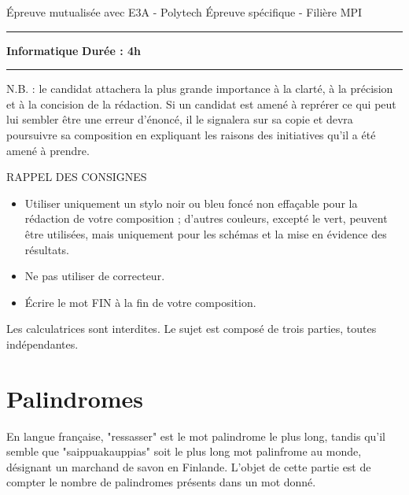 \documentclass[11pt,a4paper,french]{article}
\begin{document}
\begin{center}
  {\large
    Épreuve mutualisée avec E3A - Polytech \linebreak
    Épreuve spécifique - Filière MPI \linebreak
    \hrule
    \vspace{0.5cm}
    \textbf{Informatique} \linebreak
    \textbf{Durée : 4h} \linebreak
    \hrule
  }
\end{center}
N.B. : le candidat attachera la plus grande importance à la clarté, à la précision et à la concision de la rédaction. Si un candidat est amené à reprérer ce qui peut lui sembler être une erreur d'énoncé, il le signalera sur sa copie et devra poursuivre sa composition en expliquant les raisons des initiatives qu'il a été amené à prendre.
\vspace{2cm}
\begin{center}
  RAPPEL DES CONSIGNES \linebreak
\end{center}
\begin{itemize}
\item Utiliser uniquement un stylo noir ou bleu foncé non effaçable pour la rédaction de votre composition ; d'autres couleurs, excepté le vert, peuvent être utilisées, mais uniquement pour les schémas et la mise en évidence des résultats.
\item Ne pas utiliser de correcteur.
\item Écrire le mot FIN à la fin de votre composition.
\end{itemize}
\begin{center}
  \vspace{1cm}
  Les calculatrices sont interdites. \linebreak
  \vspace{2cm}
  Le sujet est composé de trois parties, toutes indépendantes.
\end{center}

\newpage

\section{Palindromes}

En langue française, "ressasser" est le mot palindrome le plus long, tandis qu'il semble que "saippuakauppias" soit le plus long mot palinfrome au monde, désignant un marchand de savon en Finlande. L'objet de cette partie est de compter le nombre de palindromes présents dans un mot donné.
\end{document}
